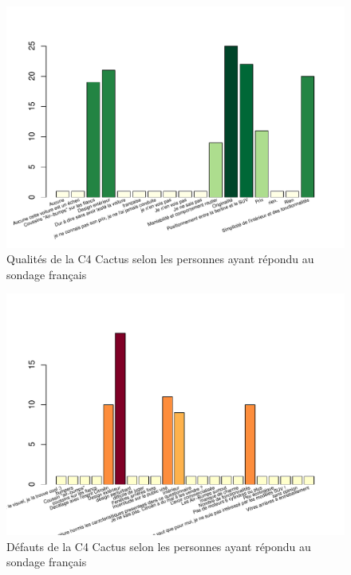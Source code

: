 \documentclass[12pt]{article}\usepackage[]{graphicx}\usepackage[]{color}
\makeatletter
\def\maxwidth{ %
  \ifdim\Gin@nat@width>\linewidth
    \linewidth
  \else
    \Gin@nat@width
  \fi
}
\newenvironment{knitrout}{}{} %
\makeatother
\begin{document}
\begin{knitrout}
\color{fgcolor}\begin{figure}[H]
\includegraphics[width=\maxwidth]{figure/qualities_fr-1} \caption[Qualités de la C4 Cactus selon les personnes ayant répondu au sondage français]{Qualités de la C4 Cactus selon les personnes ayant répondu au sondage français}\label{fig:qualities fr}
\end{figure}


\end{knitrout}

\begin{knitrout}
\color{fgcolor}\begin{figure}[H]
\includegraphics[width=\maxwidth]{figure/flaws_fr-1} \caption[Défauts de la C4 Cactus selon les personnes ayant répondu au sondage français]{Défauts de la C4 Cactus selon les personnes ayant répondu au sondage français}\label{fig:flaws fr}
\end{figure}


\end{knitrout}
\end{document}
